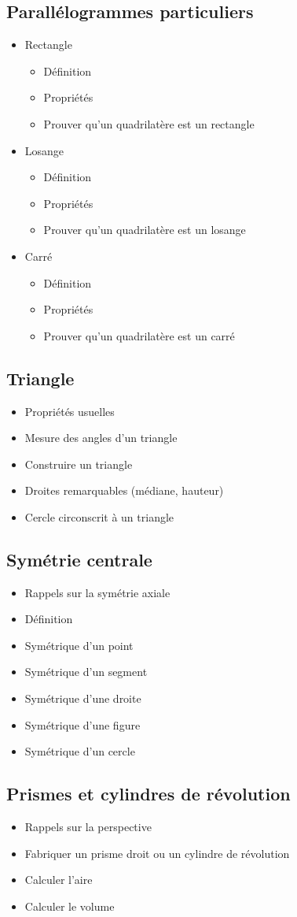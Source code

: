 \subsection{Parallélogrammes particuliers}
\begin{itemize}
	\item Rectangle
		\begin{itemize}
			\item Définition
			\item Propriétés
			\item Prouver qu'un quadrilatère est un rectangle
		\end{itemize}
	\item Losange
		\begin{itemize}
			\item Définition
			\item Propriétés
			\item Prouver qu'un quadrilatère est un losange
		\end{itemize}
	\item Carré
		\begin{itemize}
			\item Définition
			\item Propriétés
			\item Prouver qu'un quadrilatère est un carré
		\end{itemize}
\end{itemize}

\subsection{Triangle}
	\begin{itemize}
		\item Propriétés usuelles
		\item Mesure des angles d'un triangle
		\item Construire un triangle
		\item Droites remarquables (médiane, hauteur)
		\item Cercle circonscrit à un triangle
	\end{itemize}
	
\subsection{Symétrie centrale}	
\begin{itemize}
	\item Rappels sur la symétrie axiale
	\item Définition
	\item Symétrique d'un point
	\item Symétrique d'un segment
	\item Symétrique d'une droite
	\item Symétrique d'une figure
	\item Symétrique d'un cercle
\end{itemize}

\subsection{Prismes et cylindres de révolution}
\begin{itemize}
	\item Rappels sur la perspective
	\item Fabriquer un prisme droit ou un cylindre de révolution
	\item Calculer l'aire
	\item Calculer le volume
\end{itemize}
